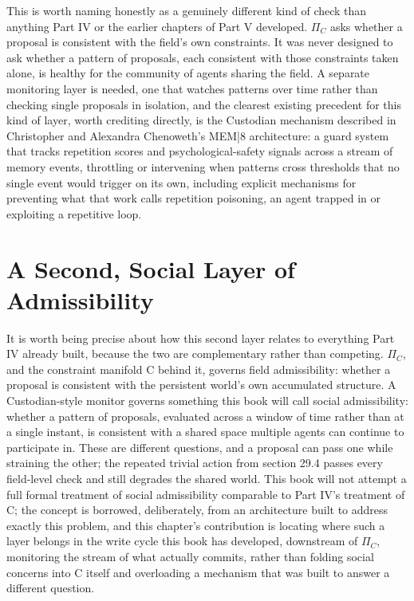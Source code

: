 This is worth naming honestly as a genuinely different kind of check than anything Part IV or the earlier chapters of Part V developed. \(\Pi_C\) asks whether a proposal is consistent with the field's own constraints. It was never designed to ask whether a pattern of proposals, each consistent with those constraints taken alone, is healthy for the community of agents sharing the field. A separate monitoring layer is needed, one that watches patterns over time rather than checking single proposals in isolation, and the clearest existing precedent for this kind of layer, worth crediting directly, is the Custodian mechanism described in Christopher and Alexandra Chenoweth's MEM|8 architecture: a guard system that tracks repetition scores and psychological-safety signals across a stream of memory events, throttling or intervening when patterns cross thresholds that no single event would trigger on its own, including explicit mechanisms for preventing what that work calls repetition poisoning, an agent trapped in or exploiting a repetitive loop.

\section{A Second, Social Layer of Admissibility}

It is worth being precise about how this second layer relates to everything Part IV already built, because the two are complementary rather than competing. \(\Pi_C\), and the constraint manifold C behind it, governs field admissibility: whether a proposal is consistent with the persistent world's own accumulated structure. A Custodian-style monitor governs something this book will call social admissibility: whether a pattern of proposals, evaluated across a window of time rather than at a single instant, is consistent with a shared space multiple agents can continue to participate in. These are different questions, and a proposal can pass one while straining the other; the repeated trivial action from section 29.4 passes every field-level check and still degrades the shared world. This book will not attempt a full formal treatment of social admissibility comparable to Part IV's treatment of C; the concept is borrowed, deliberately, from an architecture built to address exactly this problem, and this chapter's contribution is locating where such a layer belongs in the write cycle this book has developed, downstream of \(\Pi_C\), monitoring the stream of what actually commits, rather than folding social concerns into C itself and overloading a mechanism that was built to answer a different question.

